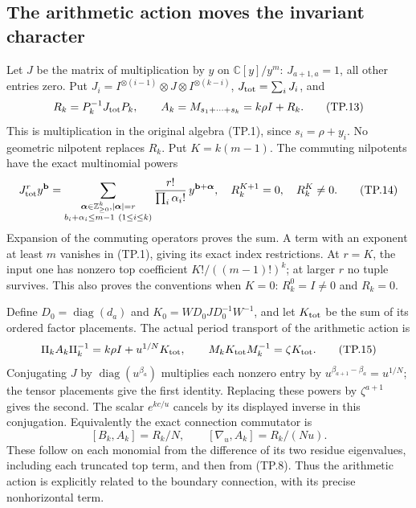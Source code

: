 \subsection{The arithmetic action moves the invariant character}

Let \(J\) be the matrix of multiplication by \(y\) on
\(\mathbb C[y]/y^m\): \(J_{a+1,a}=1\), all other entries zero.
Put \(J_i=I^{\otimes(i-1)}\otimes J\otimes I^{\otimes(k-i)}\),
\(J_{\rm tot}=\sum_iJ_i\), and
\[
 R_k=P_k^{-1}J_{\rm tot}P_k,\qquad
 A_k=M_{s_1+\cdots+s_k}=k\rho I+R_k.
 \tag{TP.13}\label{CFStage:eq:tp-arithmetic}
\]
This is multiplication in the original algebra (TP.1), since
\(s_i=\rho+y_i\). No geometric nilpotent replaces \(R_k\).
Put \(K=k(m-1)\). The commuting nilpotents have the exact
multinomial powers
\[
 J_{\rm tot}^{r}y^{\mathbf b}
  =\sum_{\substack{\boldsymbol\alpha\in\mathbb Z_{\geq0}^k,
                       |\boldsymbol\alpha|=r\\
                    b_i+\alpha_i\leq m-1\ (1\leq i\leq k)}}
       \frac{r!}{\prod_i\alpha_i!}\,y^{\mathbf b+\boldsymbol\alpha},
 \quad R_k^{K+1}=0,\quad R_k^K\ne0.
 \tag{TP.14}\label{CFStage:eq:tp-powers}
\]
Expansion of the commuting operators proves the sum. A term with
an exponent at least \(m\) vanishes in (TP.1), giving its exact
index restrictions. At \(r=K\), the input one has nonzero top
coefficient \(K!/((m-1)!)^k\); at larger \(r\) no tuple survives.
This also proves the conventions when \(K=0\): \(R_k^0=I\ne0\)
and \(R_k=0\).

Define \(D_0=\operatorname{diag}(d_a)\) and
\(K_0=WD_0JD_0^{-1}W^{-1}\), and let
\(K_{\rm tot}\) be the sum of its ordered factor placements.
The actual period transport of the arithmetic action is
\[
 \Pi_k A_k\Pi_k^{-1}=k\rho I+u^{1/N}K_{\rm tot},
 \qquad M_kK_{\rm tot}M_k^{-1}=\zeta K_{\rm tot}.
 \tag{TP.15}\label{CFStage:eq:tp-transport}
\]
Conjugating \(J\) by \(\operatorname{diag}(u^{\beta_a})\)
multiplies each nonzero entry by
\(u^{\beta_{a+1}-\beta_a}=u^{1/N}\); the tensor placements
give the first identity. Replacing these powers by
\(\zeta^{a+1}\) gives the second. The scalar \(e^{kc/u}\)
cancels by its displayed inverse in this conjugation.
Equivalently the exact connection commutator is
\[
 [B_k,A_k]=R_k/N,\qquad [\nabla_u,A_k]=R_k/(Nu).
 \tag{TP.16}\label{CFStage:eq:tp-commutator}
\]
These follow on each monomial from the difference of its two
residue eigenvalues, including each truncated top term, and then
from (TP.8). Thus the arithmetic action is explicitly related
to the boundary connection, with its precise nonhorizontal term.

